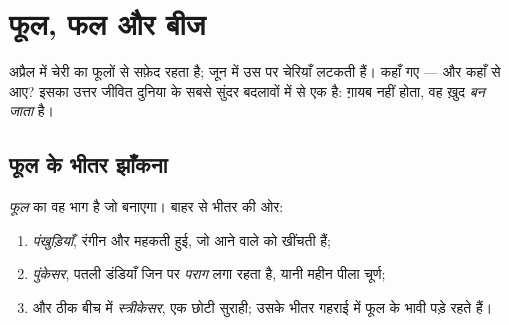 \chapter{फूल, फल और बीज}\label{ch:g3:flowers-fruits-seeds}

अप्रैल में चेरी का  फूलों से सफ़ेद रहता है; जून में उस पर चेरियाँ
लटकती हैं।  कहाँ गए --- और  कहाँ से आए? इसका उत्तर जीवित दुनिया के
सबसे सुंदर बदलावों में से एक है:  ग़ायब नहीं होता, वह ख़ुद 
\emph{बन जाता} है।

\section{फूल के भीतर झाँकना}

\begin{definition}[फूल के भाग]\label{def:g3:flowers-fruits-seeds:parts}
\emph{फूल}  का वह भाग है जो  बनाएगा। बाहर से भीतर की
ओर:
\begin{enumerate}
  \item \emph{पंखुड़ियाँ}, रंगीन और महकती हुई, जो आने
        वाले  को खींचती हैं;
  \item \emph{पुंकेसर}, पतली डंडियाँ जिन पर
        \emph{पराग} लगा रहता है, यानी महीन पीला चूर्ण;
  \item और ठीक बीच में \emph{स्त्रीकेसर}, एक छोटी
        सुराही; उसके भीतर गहराई में फूल के भावी  पड़े रहते हैं।
\end{enumerate}
\end{definition}

